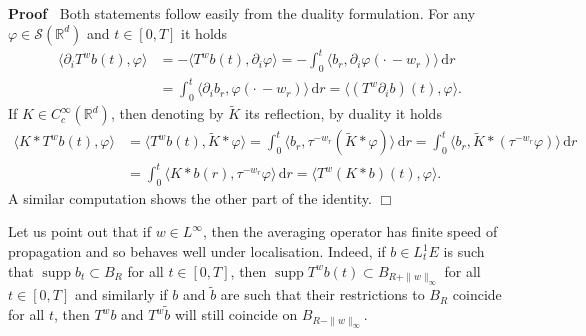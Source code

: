 \documentclass[10pt]{article}
\newcommand{\mathd}{\mathrm{d}}
\newcommand{\tmop}[1]{\ensuremath{\operatorname{#1}}}
\newenvironment{proof}{\noindent\textbf{Proof\ }}{\hspace*{\fill}$\Box$\medskip}
\begin{document}
\begin{proof}
  Both statements follow easily from the duality formulation. For any $\varphi
  \in \mathcal{S} (\mathbb{R}^d)$ and $t \in [0, T]$ it holds
%  
  \begin{align*}
    \langle \partial_i T^w b (t), \varphi \rangle & = - \langle T^w b (t),
    \partial_i \varphi \rangle = - \int_0^t \langle b_r, \partial_i \varphi
    \left( \cdot \, - w_r \right) \rangle \, \mathd r\\
    & = \int_0^t \langle \partial_i b_r, \varphi \left( \cdot \, - w_r
    \right) \rangle \, \mathd r = \langle (T^w \partial_i b) (t), \varphi
    \rangle .
  \end{align*}
%  
  If $K \in C^{\infty}_c (\mathbb{R}^d)$, then denoting by $\tilde{K}$ its
  reflection, by duality it holds
%  
  \begin{align*}
    \langle K \ast T^w b (t), \varphi \rangle & = \langle T^w b (t), \tilde{K}
    \ast \varphi \rangle = \int_0^t \langle b_r, \tau^{- w_r} (\tilde{K} \ast
    \varphi) \rangle \, \mathd r = \int_0^t \langle b_r, \tilde{K} \ast
    (\tau^{- w_r} \varphi) \rangle \, \mathd r\\
    & = \int_0^t \langle K \ast b (r), \tau^{- w_r} \varphi \rangle \, \mathd
    r = \langle T^w (K \ast b) (t), \varphi \rangle .
  \end{align*}
%  
  A similar computation shows the other part of the identity.
\end{proof}

\begin{remark}
  \label{sec3.1 remark localization}Let us point out that if $w \in
  L^{\infty}$, then the averaging operator has finite speed of propagation and
  so behaves well under localisation. Indeed, if $b \in L^1_t E$ is such that
  $\tmop{supp} b_t \subset B_R$ for all $t \in [0, T]$, then $\tmop{supp} T^w
  b (t) \subset B_{R + \| w \|_{\infty}}$ for all $t \in [0, T]$ and similarly
  if $b$ and $\tilde{b}$ are such that their restrictions to $B_R$ coincide
  for all $t$, then $T^w b$ and $T^w \tilde{b}$ will still coincide on $B_{R -
  \| w \|_{\infty}}$.
\end{remark}
\end{document}
